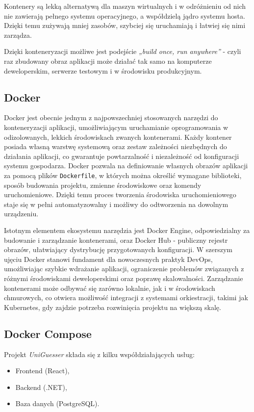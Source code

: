 Kontenery są lekką alternatywą dla maszyn wirtualnych i w odróżnieniu od nich nie zawierają pełnego systemu operacyjnego, a współdzielą jądro systemu hosta. Dzięki temu zużywają mniej zasobów, szybciej się uruchamiają i łatwiej się nimi zarządza.

Dzięki konteneryzacji możliwe jest podejście \textit{„build once, run anywhere”} - czyli raz zbudowany obraz aplikacji może działać tak samo na komputerze deweloperskim, serwerze testowym i w środowisku produkcyjnym.

\subsection{Docker}

Docker jest obecnie jednym z najpowszechniej stosowanych narzędzi do konteneryzacji aplikacji, umożliwiającym uruchamianie oprogramowania w odizolowanych, lekkich środowiskach zwanych kontenerami. Każdy kontener posiada własną warstwę systemową oraz zestaw zależności niezbędnych do działania aplikacji, co gwarantuje powtarzalność i niezależność od konfiguracji systemu gospodarza. Docker pozwala na definiowanie własnych obrazów aplikacji za pomocą plików \texttt{Dockerfile}, w których można określić wymagane biblioteki, sposób budowania projektu, zmienne środowiskowe oraz komendy uruchomieniowe. Dzięki temu proces tworzenia środowiska uruchomieniowego staje się w pełni automatyzowalny i możliwy do odtworzenia na dowolnym urządzeniu.

Istotnym elementem ekosystemu narzędzia jest Docker Engine, odpowiedzialny za budowanie i zarządzanie kontenerami, oraz Docker Hub - publiczny rejestr obrazów, ułatwiający dystrybucję przygotowanych konfiguracji. W szerszym ujęciu Docker stanowi fundament dla nowoczesnych praktyk DevOps, umożliwiając szybkie wdrażanie aplikacji, ograniczenie problemów związanych z różnymi środowiskami deweloperskimi oraz poprawę skalowalności. Zarządzanie kontenerami może odbywać się zarówno lokalnie, jak i w środowiskach chmurowych, co otwiera możliwość integracji z systemami orkiestracji, takimi jak Kubernetes, gdy zajdzie potrzeba rozwinięcia projektu na większą skalę.

\subsection{Docker Compose}

Projekt \textit{UniGuesser} składa się z kilku współdziałających usług:

\begin{itemize}
    \item Frontend (React),
    \item Backend (.NET),
    \item Baza danych (PostgreSQL).
\end{itemize}

